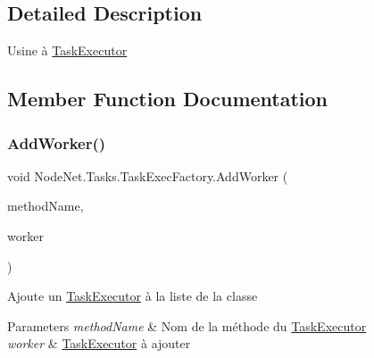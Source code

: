 \subsection{Detailed Description}
Usine à \hyperlink{class_node_net_1_1_tasks_1_1_task_executor}{Task\+Executor} 



\subsection{Member Function Documentation}
\mbox{\label{class_node_net_1_1_tasks_1_1_task_exec_factory_aa10759fa06564eae7d160da8f7ad3755}} 
\subsubsection{\texorpdfstring{Add\+Worker()}{AddWorker()}}
{\footnotesize\ttfamily void Node\+Net.\+Tasks.\+Task\+Exec\+Factory.\+Add\+Worker (\begin{DoxyParamCaption}\item[{string}]{method\+Name,  }\item[{\hyperlink{class_node_net_1_1_tasks_1_1_task_executor}{Task\+Executor}}]{worker }\end{DoxyParamCaption})}



Ajoute un \hyperlink{class_node_net_1_1_tasks_1_1_task_executor}{Task\+Executor} à la liste de la classe 


\begin{DoxyParams}{Parameters}
{\em method\+Name} & Nom de la méthode du \hyperlink{class_node_net_1_1_tasks_1_1_task_executor}{Task\+Executor}\\
\hline
{\em worker} & \hyperlink{class_node_net_1_1_tasks_1_1_task_executor}{Task\+Executor} à ajouter\\
\hline
\end{DoxyParams}
\mbox{\label{class_node_net_1_1_tasks_1_1_task_exec_factory_ae4135c4e87468a9a4e920b55c251756c}} 
